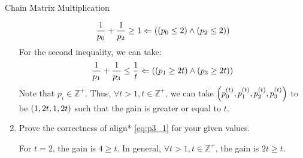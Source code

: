 \documentclass{article}
\numberwithin{table}{section}
\numberwithin{figure}{section}
\begin{document}
\begin{section}{Chain Matrix Multiplication}
\begin{enumerate}
\begin{tcolorbox}
    \begin{align*}
        \frac{1}{p_0} + \frac{1}{p_2} \geq 1 \Leftarrow \left((p_0 \leq 2) \land (p_2 \leq 2)\right)
    \end{align*}
    For the second inequality, we can take:
    \begin{align*}
        \frac{1}{p_1} + \frac{1}{p_3} \leq \frac{1}{t} \Leftarrow \left((p_1 \geq 2t) \land (p_3 \geq 2t)\right)
    \end{align*}
    Note that $p_i \in \mathbb{Z^+}$. Thus, $\forall t > 1, t \in \mathbb{Z^+}$, we can take $\left(p_0^{(t)}, p_1^{(t)}, p_2^{(t)}, p_3^{(t)}\right)$ to be $\left(1, 2t, 1, 2t\right)$ such that the gain is greater or equal to $t$.
    \end{tcolorbox}
    \item Prove the correctness of align* \ref{eq:p3_1} for your given values.
    
    \begin{tcolorbox}
        For $t = 2$, the gain is $4 \geq t$. In general, $\forall t > 1, t \in \mathbb{Z^+}$, the gain is $2t \geq t$. 
    \end{tcolorbox}
    

\end{enumerate}
\end{section}
\end{document}
